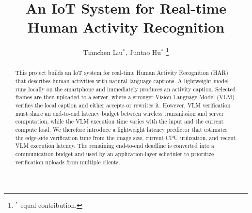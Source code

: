 \documentclass[lettersize,journal]{IEEEtran}
\begin{document}
\title{An IoT System for Real-time Human Activity Recognition}

\author{Tianchen Liu$^{*}$, Juntao Hu$^{*}$
\thanks{$^*$ equal contribution.}}


\maketitle

\begin{abstract}

This project builds an IoT system for real-time Human Activity Recognition (HAR) that describes human activities with natural language captions. A lightweight model runs locally on the smartphone and immediately produces an activity caption. Selected frames are then uploaded to a server, where a stronger
Vision-Language Model (VLM) verifies the local caption and either accepts or rewrites it. However, VLM verification must share an end-to-end latency budget between wireless transmission and server computation, while the VLM execution time varies with the input and the current compute load. We therefore introduce a lightweight latency predictor that estimates the
edge-side verification time from the image size, current CPU utilization, and
recent VLM execution latency. The remaining end-to-end deadline is converted
into a communication budget and used by an application-layer scheduler to
prioritize verification uploads from multiple clients.

\end{abstract}










\end{document}
